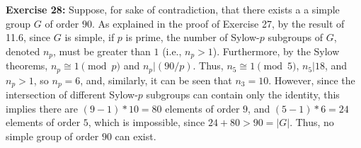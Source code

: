 \documentclass{article}%
\begin{document}
\textbf{Exercise 28:} Suppose, for sake of contradiction, that there exists a
a simple group $G$ of order $90$.
As explained in the proof of Exercise 27, by the result of 11.6, since $G$ is
simple, if $p$ is prime, the number of Sylow-$p$ subgroups of $G$, denoted
$n_p$, must be greater than $1$ (i.e., $n_p > 1$). Furthermore, by the Sylow
theorems, $n_p \cong 1 \pmod p$ and $n_p | (90/p)$. Thus, $n_5 \cong 1 \pmod
5$, $n_5 | 18$, and $n_p > 1$, so $n_p = 6$, and, similarly, it can be seen
that $n_3 = 10$. However, since the intersection of different Sylow-$p$
subgroups can contain only the identity, this implies there are $(9 - 1)*10
 = 80$ elements of order $9$, and $(5 - 1)*6 = 24$ elements of order $5$,
which is impossible, since $24 + 80 > 90 = |G|$. Thus, no simple group of order
$90$ can exist.
\end{document}

